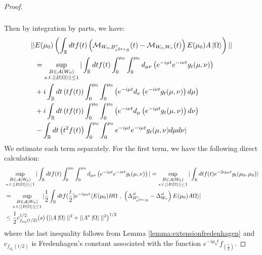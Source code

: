 \documentclass[a4paper,11pt]{article}
\theoremstyle{definition}
\newcommand{\lb}{\left(}
\newcommand{\rb}{\right)}
\begin{document}
\begin{proof}
\begin{align}
\begin{split}
        \end{split}
    \end{align}
    Then by integration by parts, we have:
    \begin{align}
        \begin{split}
            ||&E(\mu_0)\lb\int_\mathbb{R} dt f(t)\lb\mathcal{M}_{W_0,B^r_{e^{2\pi s}R}}(t) - \mathcal{M}_{W_0, W_r}(t)\rb E(\mu_0) A\ket{\Omega}\rb||
            \\&
            = \sup_{\substack{B\in\mathcal{A}(W_0)\\s.t.||B\ket{\Omega}||\leq 1}}|\int_\mathbb{R} dt f(t)\int_0^{\mu_0}\int_0^{\mu_0}d_{\mu\nu}\lb e^{-i\mu t}e^{-i\nu t}g_t(\mu,\nu)\rb 
            \\&
            + i\int_\mathbb{R} dt \lb tf(t)\rb\int_0^{\mu_0}\int_0^{\mu_0}\lb e^{-i\mu t}d_\nu \lb e^{-i\nu t}g_t(\mu,\nu) \rb d\mu\rb
            \\&
            +i\int_\mathbb{R} dt \lb tf(t)\rb\int_0^{\mu_0}\int_0^{\mu_0}\lb e^{-i\nu t} d_\mu\lb e^{-i\mu t} g_t(\mu,\nu)\rb d\nu\rb 
            \\&
            - \int_\mathbb{R} dt \lb t^2f(t) \rb\int_0^{\mu_0}\int_0^{\mu_0} e^{-i\mu t}e^{-i\mu t}g_t(\mu,\nu)d\mu d\nu|
        \end{split}
    \end{align}
    We estimate each term separately. For the first term, we have the following direct calculation:
    {\small
\begin{align}
        \begin{split}
            &\sup_{\substack{B\in\mathcal{A}(W_0)\\s.t.||B\ket{\Omega}||\leq 1}}|\int_\mathbb{R} dt f(t)\int_0^{\mu_0}\int_0^{\mu_0} d_{\mu\nu}\lb e^{-i\mu t}e^{-i\nu t}g_t(\mu,\nu) \rb| = \sup_{\substack{B\in\mathcal{A}(W_0)\\s.t.||B\ket{\Omega}||\leq 1}}|\int_\mathbb{R} dt f(t) e^{-2i\mu_0 t}g_t(\mu_0, \mu_0)|
            \\&
            =\sup_{\substack{B\in\mathcal{A}(W_0)\\s.t.||B\ket{\Omega}||\leq 1}}|\frac{1}{2}\int_\mathbb{R} dt f(\frac{t}{2}) e^{-i\mu_0 t}\langle E(\mu_0)B\Omega\text{ , }\lb\Delta_{B^r_{e^{2\pi s}R}}^{it} - \Delta_{W_r}^{it}\rb E(\mu_0)A\Omega\rangle|\\&
            \leq \frac{1}{2}c_{f_{\mu_0}(t/2)}^{1/2}(s)\lb||A\ket{\Omega}||^2 + ||A^*\ket{\Omega}||^2\rb^{1/2}
        \end{split}
    \end{align}
}
    where the last inequality follows from Lemma \ref{lemma:extensionfredenhagen} and $c_{f_{\mu_0}(t/2)}$ is Fredenhagen's constant associated with the function $e^{-i\mu_0 t}f_(\frac{t}{2})$.


\end{proof}
\end{document}
